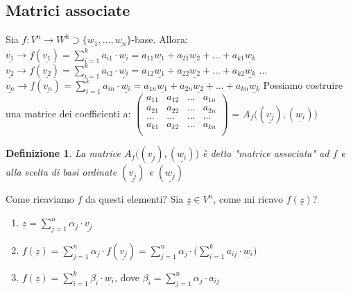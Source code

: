 \documentclass[12pt]{article}
\newenvironment{para}{\begin{adjustwidth}{13mm}{}}{\end{adjustwidth}}
\newtheorem{Definizione}{Definizione}[subsection]
\begin{document}
\begin{para}
\subsection{Matrici associate}
Sia $f:V^n \rightarrow W^k \supset \{\underline{w_1}, ..., \underline{w_n}\}$-base.
Allora: \newline
$\underline{v_1} \rightarrow f(\underline{v_1})=\sum_{i=1}^k a_{i1} \cdot \underline{w_i} = a_{11}\underline{w_1} + a_{21}\underline{w_2} + ... + a_{k1}\underline{w_k}$\newline
$\underline{v_2} \rightarrow f(\underline{v_2})=\sum_{i=1}^k a_{i2} \cdot \underline{w_i} = a_{12}\underline{w_1} + a_{22}\underline{w_2} + ... + a_{k2}\underline{w_k}$\newline
... \newline
$\underline{v_n} \rightarrow f(\underline{v_n})=\sum_{i=1}^k a_{in} \cdot \underline{w_i} = a_{1n}\underline{w_1} + a_{2n}\underline{w_2} + ... + a_{kn}\underline{w_k}$\newline
Possiamo costruire una matrice dei coefficienti a: \newline\newline
$\begin{pmatrix}
    a_{11} & a_{12} & ... & a_{1n} \\
    a_{21} & a_{22} & ... & a_{2n} \\
    ... & ... & ... & ... \\
    a_{k1} & a_{k2} & ... & a_{kn} \\
\end{pmatrix}$ = $A_f\bigl((\underline{v_j}), (\underline{w_i})\bigr)$
\begin{Definizione}
    La matrice $A_f\bigl((\underline{v_j}), (\underline{w_i})\bigr)$ è detta "matrice associata" ad $f$ e alla scelta di basi ordinate $(\underline{v_j})$ e $(\underline{w_j})$
\end{Definizione}
Come ricaviamo $f$ da questi elementi? Sia $\underline{z} \in V^n$, come mi ricavo $f(\underline{z})$?
\begin{enumerate}
    \item $\underline{z} = \sum_{j=1}^n \alpha_j \cdot \underline{v_j}$
    \item $f(\underline{z})=\sum_{j=1}^n \alpha_j \cdot f(\underline{v_j}) = \sum_{j=1}^n \alpha_j \cdot \bigl(\sum_{i=1}^k a_{ij} \cdot \underline{w_i} \bigr)$ 
    \item $f(\underline{z}) = \sum_{i=1}^k \beta_i \cdot \underline{w_i}$, dove $\beta_i = \sum_{j=1}^n \alpha_j \cdot a_{ij}$
\end{enumerate}

\end{para}
\end{document}
